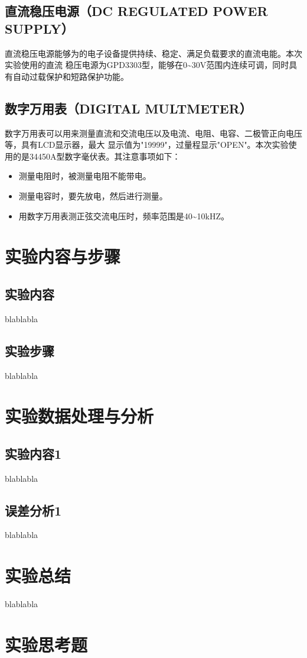 \documentclass[a4paper,11pt,UTF8]{ctexart}
\begin{document}
\subsection{直流稳压电源（DC REGULATED POWER SUPPLY）}
直流稳压电源能够为的电子设备提供持续、稳定、满足负载要求的直流电能。本次实验使用的直流
稳压电源为GPD3303型，能够在0\~{}30V范围内连续可调，同时具有自动过载保护和短路保护功能。
\subsection{数字万用表（DIGITAL MULTMETER）}
数字万用表可以用来测量直流和交流电压以及电流、电阻、电容、二极管正向电压等，具有LCD显示器，最大
显示值为"19999"，过量程显示"OPEN"。本次实验使用的是34450A型数字毫伏表。其注意事项如下：
\begin{itemize}
  \item 测量电阻时，被测量电阻不能带电。
  \item 测量电容时，要先放电，然后进行测量。
  \item 用数字万用表测正弦交流电压时，频率范围是40\~{}10kHZ。
\end{itemize}
\section{实验内容与步骤}
\subsection{实验内容}
	blablabla
\subsection{实验步骤}
	blablabla

\section{实验数据处理与分析}
\subsection{实验内容1}
	blablabla
\subsection{误差分析1}
	blablabla

\section{实验总结}
blablabla
\section{实验思考题}
\end{document}
